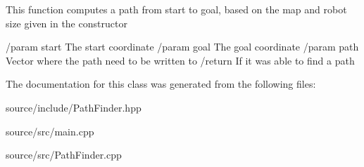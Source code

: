 This function computes a path from start to goal, based on the map and robot size given in the constructor

/param start The start coordinate /param goal The goal coordinate /param path Vector where the path need to be written to /return If it was able to find a path 

The documentation for this class was generated from the following files\+:\begin{DoxyCompactItemize}
\item 
source/include/Path\+Finder.\+hpp\item 
source/src/main.\+cpp\item 
source/src/Path\+Finder.\+cpp\end{DoxyCompactItemize}
